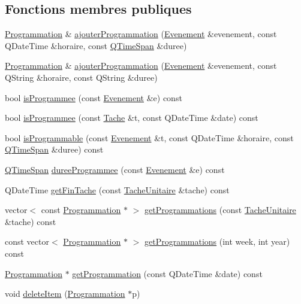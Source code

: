 \subsection*{Fonctions membres publiques}
\begin{DoxyCompactItemize}
\item 
\hyperlink{class_programmation}{Programmation} \& \hyperlink{class_programmation_manager_acc7437f476ff946f81f676161b2e5d7a}{ajouter\+Programmation} (\hyperlink{class_evenement}{Evenement} \&evenement, const Q\+Date\+Time \&horaire, const \hyperlink{class_q_time_span}{Q\+Time\+Span} \&duree)
\item 
\hyperlink{class_programmation}{Programmation} \& \hyperlink{class_programmation_manager_a98ce96ec69b8df333648132fdb64840f}{ajouter\+Programmation} (\hyperlink{class_evenement}{Evenement} \&evenement, const Q\+String \&horaire, const Q\+String \&duree)
\item 
bool \hyperlink{class_programmation_manager_a55d24db8e1764ca3448e0451c6c9d211}{is\+Programmee} (const \hyperlink{class_evenement}{Evenement} \&e) const 
\item 
bool \hyperlink{class_programmation_manager_a4fae79fb6e160ca921b39060d9722c13}{is\+Programmee} (const \hyperlink{class_tache}{Tache} \&t, const Q\+Date\+Time \&date) const 
\item 
bool \hyperlink{class_programmation_manager_a17f660f90e17cfa6d87274644238ad74}{is\+Programmable} (const \hyperlink{class_evenement}{Evenement} \&t, const Q\+Date\+Time \&horaire, const \hyperlink{class_q_time_span}{Q\+Time\+Span} \&duree) const 
\item 
\hyperlink{class_q_time_span}{Q\+Time\+Span} \hyperlink{class_programmation_manager_a2f48066312a266f60c8b2b9bcf16b561}{duree\+Programmee} (const \hyperlink{class_evenement}{Evenement} \&e) const 
\item 
Q\+Date\+Time \hyperlink{class_programmation_manager_a808640afebdc24483826a1d3bc5d353a}{get\+Fin\+Tache} (const \hyperlink{class_tache_unitaire}{Tache\+Unitaire} \&tache) const 
\item 
vector$<$ const \hyperlink{class_programmation}{Programmation} $\ast$ $>$ \hyperlink{class_programmation_manager_a312930a36ef51d2d2e5b984438d57cd8}{get\+Programmations} (const \hyperlink{class_tache_unitaire}{Tache\+Unitaire} \&tache) const 
\item 
const vector$<$ \hyperlink{class_programmation}{Programmation} $\ast$ $>$ \hyperlink{class_programmation_manager_a3eea8e9a8f5d63e49e7a380d68272ff1}{get\+Programmations} (int week, int year) const 
\item 
\hyperlink{class_programmation}{Programmation} $\ast$ \hyperlink{class_programmation_manager_ad5f64c40cc00911159d5faf75b71deb1}{get\+Programmation} (const Q\+Date\+Time \&date) const 
\item 
void \hyperlink{class_programmation_manager_a640212a0312d5a83988c91f8673ea51b}{delete\+Item} (\hyperlink{class_programmation}{Programmation} $\ast$p)
\end{DoxyCompactItemize}
